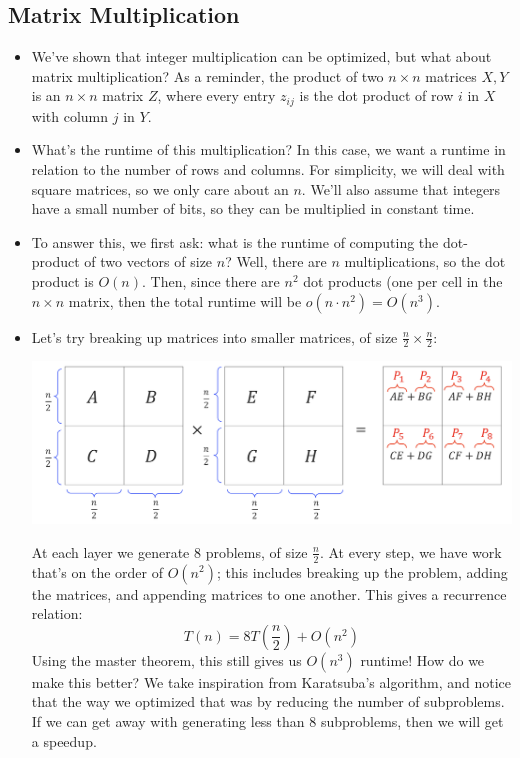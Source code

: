 \subsection{Matrix Multiplication}
\begin{itemize}
	\item We've shown that integer multiplication can be optimized, but what about matrix multiplication? As a reminder, 
		the product of two \( n \times n \) matrices \( X, Y \) is an \( n \times n  \) matrix  \( Z \), where every 
		entry \( z_{ij} \) is the dot product of row \( i \) in \( X \) with column \( j \) in \( Y \). 
	\item What's the runtime of this multiplication? In this case, we want a runtime in relation to the number of rows and 
		columns. For simplicity, we will deal with square matrices, so we only care about an \( n \). We'll also assume 
		that integers have a small number of bits, so they can be multiplied in constant time. 
	\item To answer this, we first ask: what is the runtime of computing the dot-product of two vectors of size \( n \)? Well, 
		there are \( n \) multiplications, so the dot product is \( O(n) \). Then, since there are \( n^2 \) dot products (one 
		per cell in the \( n \times n \) matrix, then the total runtime will be \( o(n \cdot n^2) = O(n^3) \). 
	\item Let's try breaking up matrices into smaller matrices, of size \( \frac{n}{2} \times \frac{n}{2} \):
		\begin{center}
			\includegraphics[scale=0.6]{matrix-multiplication.png}
		\end{center}
		At each layer we generate \( 8 \) problems, of size \( \frac{n}{2} \). At every step, we have work that's on the order 
		of \( O(n^2) \); this includes breaking up the problem, adding the matrices, and appending matrices to one another. This 
		gives a recurrence relation: 
		\[
		T(n) = 8T\left( \frac{n}{2} \right) + O(n^2)
		\] 
		Using the master theorem, this still gives us \( O(n^3) \) runtime! How do we make this better? We take inspiration from 
		Karatsuba's algorithm, and notice that the way we optimized that was by reducing the number of subproblems. If we can 
		get away with generating less than 8 subproblems, then we will get a speedup.  
\end{itemize}

